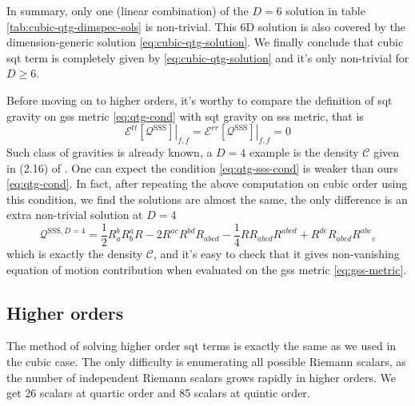 \documentclass[a4paper,11pt]{article}
\begin{document}
In summary, only one (linear combination) of the $D = 6$ solution in table \ref{tab:cubic-qtg-dimspec-sols} is non-trivial. This 6D solution is also covered by the dimension-generic solution \eqref{eq:cubic-qtg-solution}. We finally conclude that cubic \ac{sqt} term is completely given by \eqref{eq:cubic-qtg-solution} and it's only non-trivial for $D \geqslant 6$.

Before moving on to higher orders, it's worthy to compare the definition of \ac{sqt} gravity on \ac{gss} metric \eqref{eq:qtg-cond} with \ac{sqt} gravity on \ac{sss} metric, that is
\begin{equation}\label{eq:qtg-sss-cond}
    \left.\mathcal E^{tt}[\mathcal Q^{\mathrm{SSS}}]\right|_{f, f} = \left.\mathcal E^{rr}[\mathcal Q^{\mathrm{SSS}}]\right|_{f, f} = 0
\end{equation}
Such class of gravities is already known, a $D = 4$ example is the density $\mathcal C$ given in (2.16) of \cite{cubic-gqtg}. One can expect the condition \eqref{eq:qtg-sss-cond} is weaker than ours \eqref{eq:qtg-cond}. In fact, after repeating the above computation on cubic order using this condition, we find the solutions are almost the same, the only difference is an extra non-trivial solution at $D = 4$
\begin{equation}
    \mathcal Q^{\mathrm{SSS}, D = 4} = \frac{1}{2}R_a^b R_b^a R - 2 R^{ac}R^{bd}R_{abcd} - \frac{1}{4}RR_{abcd}R^{abcd} + R^{de}R_{abcd}R^{abc}{}_e
\end{equation}
which is exactly the density $\mathcal C$, and it's easy to check that it gives non-vanishing equation of motion contribution when evaluated on the \ac{gss} metric \eqref{eq:gss-metric}.

\subsection{Higher orders}
The method of solving higher order \ac{sqt} terms is exactly the same as we used in the cubic case. The only difficulty is enumerating all possible Riemann scalars, as the number of independent Riemann scalars grows rapidly in higher orders. We get 26 scalars at quartic order \cite{fulling-tensor-polynomials} and 85 scalars at quintic order.
\end{document}
